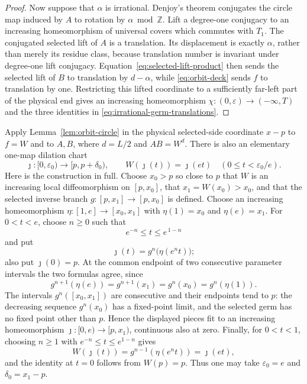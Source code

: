 \documentclass[11pt]{article}
\theoremstyle{definition}
\theoremstyle{remark}
\begin{document}
\begin{proof}
Now suppose that $\alpha$ is irrational.  Denjoy's theorem conjugates the
circle map induced by $A$ to rotation by $\alpha\bmod\mathbb Z$.  Lift a
degree-one conjugacy to an increasing homeomorphism of universal covers
which commutes with $T_1$.  The conjugated selected lift of $A$ is a
translation.  Its displacement is exactly $\alpha$, rather than merely its
residue class, because translation number is invariant under degree-one lift
conjugacy.  Equation~\eqref{eq:selected-lift-product} then sends the selected
lift of $B$ to translation by $d-\alpha$, while
\eqref{eq:orbit-deck} sends $f$ to translation by one.  Restricting this
lifted coordinate to a sufficiently far-left part of the physical end gives
an increasing homeomorphism
$\chi:(0,\varepsilon)\to(-\infty,T)$ and the three identities in
\eqref{eq:irrational-germ-translations}.
\end{proof}

Apply Lemma~\ref{lem:orbit-circle} in the physical selected-side coordinate
\(x-p\) to \(f=W\) and to \(A,B\), where \(d=L/2\) and \(AB=W^d\).
There is also an elementary one-map dilation chart
\[
 \jmath:[0,\varepsilon_0)\longrightarrow[p,p+\delta_0),\qquad
 W(\jmath(t))=\jmath(et)\quad(0\leq t<\varepsilon_0/e).
\]
Here is the construction in full.  Choose \(x_0>p\) so close to \(p\) that
\(W\) is an increasing local diffeomorphism on \([p,x_0]\), that
\(x_1=W(x_0)>x_0\), and that the selected inverse branch
\(g:[p,x_1]\to[p,x_0]\) is defined.  Choose an increasing homeomorphism
\(\eta:[1,e]\to[x_0,x_1]\) with \(\eta(1)=x_0\) and \(\eta(e)=x_1\).
For \(0<t<e\), choose \(n\geq0\) such that
\[
 e^{-n}\leq t\leq e^{\,1-n}
\]
and put
\[
 \jmath(t)=g^n\bigl(\eta(e^nt)\bigr);
\]
also put \(\jmath(0)=p\).  At the common endpoint of two consecutive
parameter intervals the two formulas agree, since
\[
 g^{n+1}(\eta(e))=g^{n+1}(x_1)
 =g^n(x_0)=g^n(\eta(1)).
\]
The intervals \(g^n([x_0,x_1])\) are consecutive and their endpoints tend
to \(p\): the decreasing sequence \(g^n(x_0)\) has a fixed-point limit, and
the selected germ has no fixed point other than \(p\).  Hence the displayed
pieces fit to an increasing homeomorphism
\(\jmath:[0,e)\to[p,x_1)\), continuous also at zero.  Finally, for
\(0<t<1\), choosing \(n\geq1\) with
\(e^{-n}\leq t\leq e^{1-n}\) gives
\[
 W(\jmath(t))=g^{n-1}(\eta(e^nt))=\jmath(et),
\]
and the identity at \(t=0\) follows from \(W(p)=p\).  Thus one may take
\(\varepsilon_0=e\) and \(\delta_0=x_1-p\).
\end{document}

